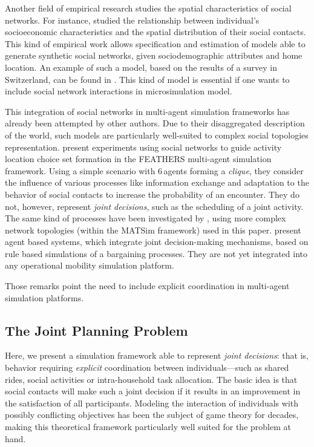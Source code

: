 {Another field of empirical research studies the spatial characteristics of social networks. For instance, \citet{CarrascoJAEtAl_TRR_2008} studied the relationship between individual's socioeconomic
characteristics and the spatial distribution of their social contacts. This kind of empirical work allows specification and estimation of models able to generate synthetic social networks, given sociodemographic attributes and home location. An example of such a model, based on the results of a survey in Switzerland, can be found in \citet{ArentzeEtAl_TRB_2012}. This kind of model is essential if one wants to include social network interactions in microsimulation model.

This integration of social networks in multi-agent simulation frameworks has already been attempted by other authors. Due to their disaggregated description of the world, such models are particularly well-suited to complex social topologies representation. \citet{HanQEtAl_TransResPartA_2011} present experiments using social networks to guide activity location choice set formation in the FEATHERS multi-agent simulation framework. Using a simple scenario with 6\,agents forming a \emph{clique}, %
they consider the influence of various processes like information exchange and adaptation to the behavior of social contacts to increase the probability of an encounter. They do not, however, represent \emph{joint decisions}, such as the scheduling of a joint activity. The same kind of processes have been investigated by \citet{Hackney_PhDThesis_2009}, using more complex network topologies (within the MATSim framework) used in this paper. \citet{RonaldEtAl_TransResB_2012, MaEtAl_TRR_2011,MaEtAl_IATBR_2012} present agent based systems, which integrate joint decision-making mechanisms, based on rule based simulations of a bargaining processes. They are not yet integrated into any operational mobility simulation platform.

Those remarks point the need to include explicit coordination in multi-agent simulation platforms.

\subsection{The Joint Planning Problem}
Here, we present a simulation framework able to represent \emph{joint decisions}: that is, behavior requiring \emph{explicit} coordination between individuals---such as shared rides, social activities or intra-household task allocation. The basic idea is that social contacts will make such a joint decision if it results in an improvement in the satisfaction of all participants.  Modeling  the interaction of individuals with possibly conflicting objectives has been the subject of game theory for decades, making this theoretical framework particularly well suited for the problem at hand.

}
